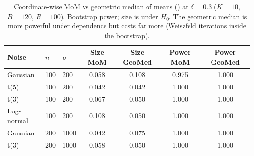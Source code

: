 \begin{table}[t]
\centering\small
\caption{Coordinate-wise MoM vs geometric median of means (\citet{minsker2015}) at $\delta=0.3$ ($K=10$, $B=120$, $R=100$). Bootstrap power; size is under $H_0$. The geometric median is more powerful under dependence but costs far more (Weiszfeld iterations inside the bootstrap).}
\label{tab:gm}
\begin{tabular}{lllcccc}
\toprule
Noise & $n$ & $p$ & Size MoM & Size GeoMed & Power MoM & Power GeoMed \\
\midrule
Gaussian & 100 & 200 & 0.058 & 0.108 & 0.975 & 1.000 \\
t(5) & 100 & 200 & 0.042 & 0.042 & 1.000 & 1.000 \\
t(3) & 100 & 200 & 0.067 & 0.050 & 1.000 & 1.000 \\
Log-normal & 100 & 200 & 0.108 & 0.050 & 1.000 & 1.000 \\
Gaussian & 200 & 1000 & 0.042 & 0.075 & 1.000 & 1.000 \\
t(3) & 200 & 1000 & 0.058 & 0.050 & 1.000 & 1.000 \\
\bottomrule
\end{tabular}
\end{table}